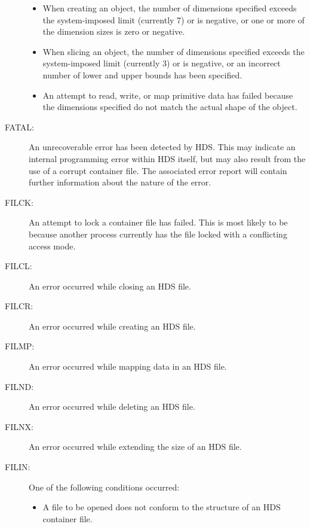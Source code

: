 \documentclass[twoside,11pt]{article}
\newcommand{\htmlref}[2]{#1}
\renewcommand{\_}{\texttt{\symbol{95}}}
\begin{document}
\begin{description}
\begin{itemize}
\item When creating an object, the number of dimensions specified exceeds the
system-imposed limit (currently 7) or is negative, or one or more of the
dimension sizes is zero or negative.

\item When slicing an object, the number of dimensions specified exceeds the
system-imposed limit (currently 3) or is negative, or an incorrect number of
lower and upper bounds has been specified.

\item An attempt to read, write, or map primitive data has failed because the
dimensions specified do not match the actual \htmlref{shape}{sect:shape} of the object.

\end{itemize}

\item [FATAL:]
An unrecoverable error has been detected by HDS. This may indicate an internal
programming error within HDS itself, but may also result from the use of a
corrupt container file. The associated error report will contain further
information about the nature of the error.

\item [FILCK:]
An attempt to lock a container file has failed. This is most likely to be
because another process currently has the file locked with a conflicting access
mode.

\item [FILCL:]
An error occurred while closing an HDS file.

\item [FILCR:]
An error occurred while creating an HDS file.

\item [FILMP:]
An error occurred while mapping data in an HDS file.

\item [FILND:]
An error occurred while deleting an HDS file.

\item [FILNX:]
An error occurred while extending the size of an HDS file.

\item [FILIN:]
One of the following conditions occurred:
\begin{itemize}

\item A file to be opened does not conform to the structure of an HDS container
file.


\end{itemize}
\end{description}
\end{document}
